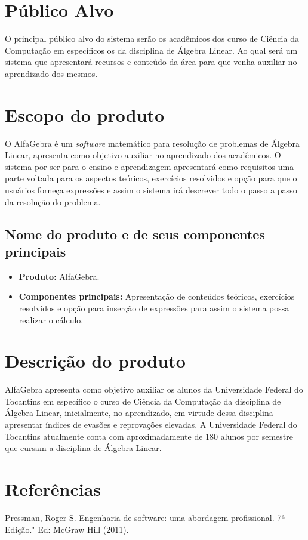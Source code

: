 \documentclass{scrreprt}
\begin{document}
\section{Público Alvo}
O principal público alvo do sistema serão os acadêmicos dos curso de Ciência da Computação em específicos os da disciplina de Álgebra Linear. Ao qual será um sistema que apresentará recursos e conteúdo da área para que venha auxiliar no aprendizado dos mesmos.

\section{Escopo do produto}
O AlfaGebra é um \textit{software} matemático para resolução de problemas de Álgebra Linear, apresenta como objetivo auxiliar no aprendizado dos acadêmicos. O sistema por ser para o ensino e aprendizagem apresentará como requisitos uma parte voltada para os aspectos teóricos, exercícios resolvidos e opção para que o usuários forneça expressões e assim o sistema irá descrever todo o passo a passo da resolução do problema.

\subsection{Nome do produto e de seus componentes principais}
\begin{itemize}
    \item \textbf{Produto: }AlfaGebra.
    \item \textbf{Componentes principais: }Apresentação de conteúdos teóricos, exercícios resolvidos e opção para inserção de expressões para assim o sistema possa realizar o cálculo.
\end{itemize}

\section{Descrição do produto}
AlfaGebra apresenta como objetivo auxiliar os alunos da Universidade Federal do Tocantins em específico o curso de Ciência da Computação da disciplina de Álgebra Linear, inicialmente, no aprendizado, em virtude dessa disciplina apresentar índices de evasões e reprovações elevadas. A Universidade Federal do Tocantins atualmente conta com aproximadamente de 180 alunos por semestre que cursam a disciplina de Álgebra Linear.

\section{Referências}
Pressman, Roger S. Engenharia de software: uma abordagem profissional. 7ª Edição." Ed: McGraw Hill (2011).\newline
\end{document}
